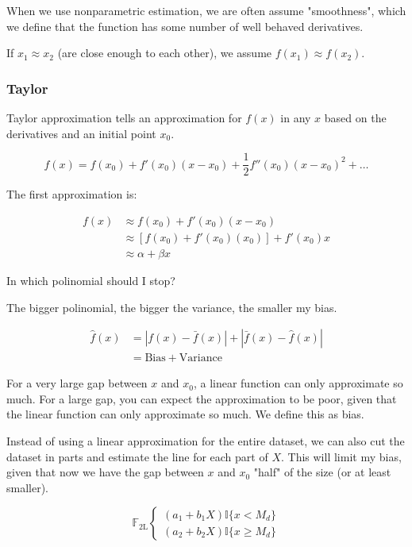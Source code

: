 \documentclass{article}
\begin{document}
When we use nonparametric estimation, we are often assume "smoothness", which we define that the function has some number of well behaved derivatives.

If $x_1 \approx x_2$ (are close enough to each other), we assume $f(x_1) \approx f(x_2)$.

\subsubsection{Taylor}

Taylor approximation tells an approximation for $f(x)$ in any $x$ based on the derivatives and an initial point $x_0$.

$$
f(x) = f(x_0) + f'(x_0)(x - x_0) + \frac{1}{2} f''(x_0)(x - x_0)^2 + \ldots
$$

The first approximation is:

\begin{align*}
    f(x) &\approx f(x_0) + f'(x_0)(x - x_0) \\
    &\approx \left[f(x_0) + f'(x_0)(x_0)\right] + f'(x_0)x \\
    &\approx \alpha + \beta x
\end{align*}

In which polinomial should I stop?

The bigger polinomial, the bigger the variance, the smaller my bias.

\begin{align*}
    \hat{f}(x) &= | f(x) - \bar{f}(x) | + | \bar{f}(x) - \hat{f}(x) |  \\
    &= \text{Bias} + \text{Variance}
\end{align*}

For a very large gap between $x$ and $x_0$, a linear function can only approximate so much. For a large gap, you can expect the approximation to be poor, given that the linear function can only approximate so much. We define this as bias.

Instead of using a linear approximation for the entire dataset, we can also cut the dataset in parts and estimate the line for each part of $X$. This will limit my bias, given that now we have the gap between $x$ and $x_0$ "half" of the size (or at least smaller).

$$
\mathbb{F}_{\text{2L}}
\begin{cases*}
    (a_1 + b_1 X) \mathbb{I} \{x < M_d\} \\
    (a_2 + b_2 X) \mathbb{I} \{x \geq M_d\}
\end{cases*}
$$
\end{document}
